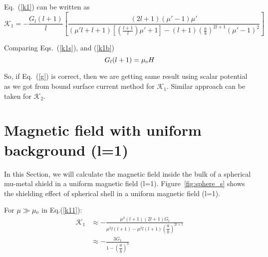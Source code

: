Eq.~(\ref{k1}) can be written as
\begin{equation}\label{k1b}
\mathcal{K}_1=-\frac{G_l (l+1)}{l}\left[\frac{(2l+1)(\mu'-1)\mu'}{(\mu'l+l+1)\left[\left(\frac{l+1}{l}\right)\mu'+1\right]-(l+1)\left(\frac{a}{b}\right)^{2l+1}(\mu'-1)^2}\right]
\end{equation}

Comparing Eqs.~(\ref{k1s}), and (\ref{k1b})
\begin{equation}\label{g}
G_l(l+1)=\mu_{\scriptscriptstyle 0} H
\end{equation}

So, if Eq.~(\ref{g}) is correct, then we are getting same result using scalar potential as we got from bound surface current method for $\mathcal{K}_1$. Similar approach can be taken for $\mathcal{K}_2$.


\section{Magnetic field with uniform background (l=1)}\label{sec:uniform}


In this Section, we will calculate the magnetic field inside the bulk of a spherical mu-metal shield in a uniform magnetic field (l=1). Figure~\ref{fig:sphere_s} shows the shielding effect of spherical shell in a uniform magnetic field (l=1). 

For \(\mu\gg\mu_{\scriptscriptstyle 0}\) in Eq.(\ref{k11}):
\begin{equation}\label{k12}
\begin{split}
\mathcal{K}_1 & \approx-\frac{\mu^2(l+1) (2l+1)G_l}{\mu^2 l(l+1)-\mu^2 l(l+1)\left(\dfrac{a}{b}\right)^{2l+1}}\\
& \approx-\frac{3 G_1}{1-\left(\dfrac{a}{b}\right)^{3}}
\end{split}
\end{equation}

